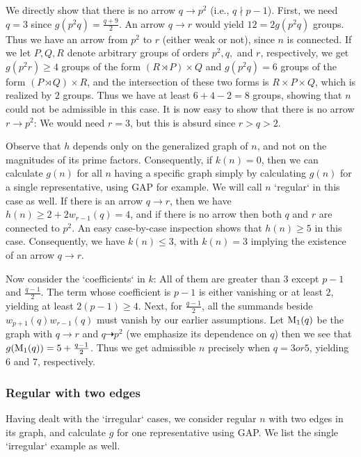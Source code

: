 We directly show that there is no arrow $q \rightarrow p^2$ (i.e., $q \nmid p - 1$). First, we need $q = 3$ since $g(p^2 q) = \frac{q + 9}{2}$. An arrow $q \rightarrow r$ would yield $12 = 2g(p^2 q)$ groups. Thus we have an arrow from $p^2$ to $r$ (either weak or not), since $n$ is connected. If we let $P, Q, R$ denote arbitrary groups of orders $p^2, q,$ and $r$, respectively, we get $g(p^2 r) \ge 4$ groups of the form $(R \rtimes P) \times Q$ and $g(p^2 q) = 6$ groups of the form $(P \rtimes Q) \times R$, and the intersection of these two forms is $R \times P \times Q$, which is realized by $2$ groups. Thus we have at least $6 + 4 - 2 = 8$ groups, showing that $n$ could not be admissible in this case. It is now easy to show that there is no arrow $r \rightarrow p^2$: We would need $r = 3$, but this is absurd since $r > q > 2$.

Observe that $h$ depends only on the generalized graph of $n$, and not on the magnitudes of its prime factors. Consequently, if $k(n) = 0$, then we can calculate $g(n)$ for all $n$ having a specific graph simply by calculating $g(n)$ for a single representative, using GAP for example. We will call $n$ `regular` in this case as well. If there is an arrow $q \rightarrow r$, then we have $h(n) \ge 2 + 2w_{r - 1}(q) = 4$, and if there is no arrow then both $q$ and $r$ are connected to $p^2$. An easy case-by-case inspection shows that $h(n) \ge 5$ in this case. Consequently, we have $k(n) \le 3$, with $k(n) = 3$ implying the existence of an arrow $q \rightarrow r$.

Now consider the `coefficients` in $k$: All of them are greater than $3$ except $p - 1$ and $\frac{q - 1}{2}$. The term whose coefficient is $p - 1$ is either vanishing or at least $2$, yielding at least $2(p - 1) \ge 4$. Next, for $\frac{q - 1}{2}$, all the summands beside $w_{p + 1}(q)w_{r - 1}(q)$ must vanish by our earlier assumptions. Let $\text{M}_{1}(q)$ be the graph with $q \rightarrow r$ and $q \dashrightarrow p^2$ (we emphasize its dependence on $q$) then we see that $g(\text{M}_{1}(q)) = 5 + \frac{q - 1}{2}$. Thus we get admissible $n$ precisely when $q = 3 or 5$, yielding $6$ and $7$, respectively.

\subsubsection*{Regular  with two edges}
Having dealt with the `irregular` cases, we consider regular $n$ with two edges in its graph, and calculate $g$ for one representative using GAP. We list the single `irregular` example as well.

